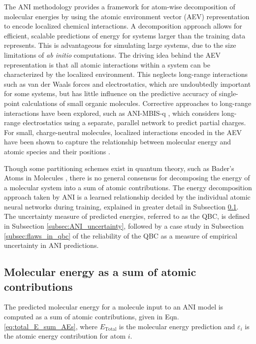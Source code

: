 The ANI methodology provides a framework for atom-wise decomposition of molecular energies by using the atomic environment vector (AEV) representation to encode localized chemical interactions.
A decomposition approach allows for efficient, scalable predictions of energy for systems larger than the training data represents.
This is advantageous for simulating large systems, due to the size limitations of \textit{ab initio} computations.
The driving idea behind the AEV representation is that all atomic interactions within a system can be characterized by the localized environment. 
This neglects long-range interactions such as van der Waals forces and electrostatics, which are undoubtedly important for some systems, but has little influence on the predictive accuracy of single-point calculations of small organic molecules.
Corrective approaches to long-range interactions have been explored, such as ANI-MBIS-q \cite{ml_mm_santi_y_jonny2}, which considers long-range electrostatics using a separate, parallel network to predict partial charges.
For small, charge-neutral molecules, localized interactions encoded in the AEV have been shown to capture the relationship between molecular energy and atomic species and their positions \cite{ani-1, ani-1x, ani-2x}.

Though some partitioning schemes exist in quantum theory, such as Bader's Atoms in Molecules \cite{bader_aim}, there is no general consensus for decomposing the energy of a molecular system into a sum of atomic contributions.
The energy decomposition approach taken by ANI is a learned relationship decided by the individual atomic neural networks during training, explained in greater detail in Subsection \ref{subsec:total_E_sum_AEs}.
The uncertainty measure of predicted energies, referred to as the QBC, is defined in Subsection \ref{subsec:ANI_uncertainty}, followed by a case study in Subsection \ref{subsec:flaws_in_qbc} of the reliability of the QBC as a measure of empirical uncertainty in ANI predictions.

\subsection{Molecular energy as a sum of atomic contributions}
\label{subsec:total_E_sum_AEs}

The predicted molecular energy for a molecule input to an ANI model is computed as a sum of atomic contributions, given in Eqn. \ref{eq:total_E_sum_AEs}, where $E_{\text{Total}}$ is the molecular energy prediction and $\varepsilon_i$ is the atomic energy contribution for atom $i$.

